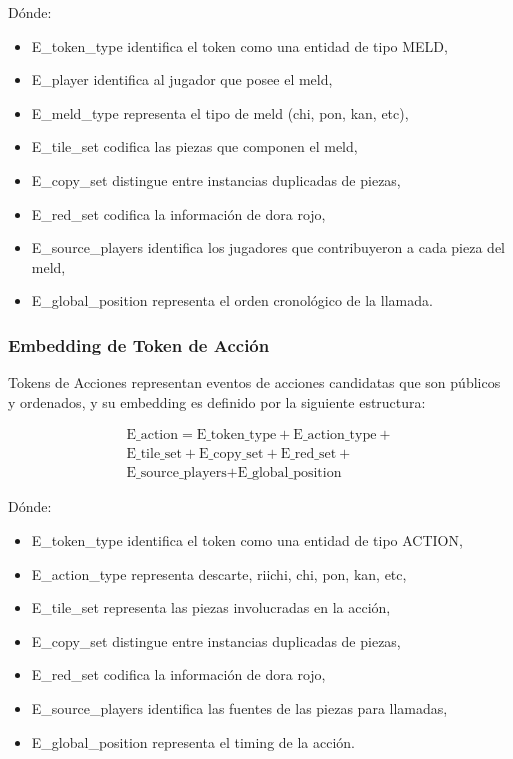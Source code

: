 Dónde:

\begin{itemize}
  \item E\_token\_type identifica el token como una entidad de tipo MELD,
  \item E\_player identifica al jugador que posee el meld,
  \item E\_meld\_type representa el tipo de meld (chi, pon, kan, etc),
  \item E\_tile\_set codifica las piezas que componen el meld,
  \item E\_copy\_set distingue entre instancias duplicadas de piezas,
  \item E\_red\_set codifica la información de dora rojo,
  \item E\_source\_players identifica los jugadores que contribuyeron a cada pieza del meld,
  \item E\_global\_position representa el orden cronológico de la llamada.
\end{itemize}

\subsubsection{Embedding de Token de Acción}

Tokens de Acciones representan eventos de acciones candidatas que son públicos y ordenados, y su embedding es definido por la siguiente estructura:

\begin{equation}
  \begin{split}
    \text{E\_action} = \text{E\_token\_type} + \text{E\_action\_type} + \\ \text{E\_tile\_set} + \text{E\_copy\_set} + \text{E\_red\_set} + \\ \text{E\_source\_players} + \text{E\_global\_position}
  \end{split}
\end{equation}


Dónde:

\begin{itemize}
  \item E\_token\_type identifica el token como una entidad de tipo ACTION,
  \item E\_action\_type representa descarte, riichi, chi, pon, kan, etc,
  \item E\_tile\_set representa las piezas involucradas en la acción,
  \item E\_copy\_set distingue entre instancias duplicadas de piezas,
  \item E\_red\_set codifica la información de dora rojo,
  \item E\_source\_players identifica las fuentes de las piezas para llamadas,
  \item E\_global\_position representa el timing de la acción.
\end{itemize}

